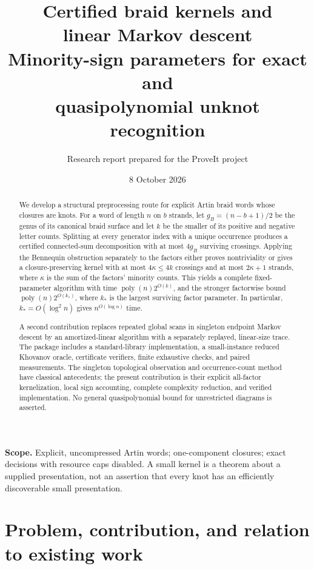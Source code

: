 \documentclass[11pt,letterpaper]{article}
\title{\vspace{-1.3em}\textbf{Certified braid kernels and\\linear Markov descent}\\[0.45em]
\large Minority-sign parameters for exact and\\quasipolynomial unknot recognition}
\author{Research report prepared for the ProveIt project}
\date{8 October 2026}
\theoremstyle{definition}
\newcommand{\poly}{\operatorname{poly}}
\begin{document}
\maketitle
\begin{abstract}
We develop a structural preprocessing route for explicit Artin braid words whose closures are knots. For a word of length $n$ on $b$ strands, let $g_B=(n-b+1)/2$ be the genus of its canonical braid surface and let $k$ be the smaller of its positive and negative letter counts. Splitting at every generator index with a unique occurrence produces a certified connected-sum decomposition with at most $4g_B$ surviving crossings. Applying the Bennequin obstruction separately to the factors either proves nontriviality or gives a closure-preserving kernel with at most $4\kappa\le4k$ crossings and at most $2\kappa+1$ strands, where $\kappa$ is the sum of the factors' minority counts. This yields a complete fixed-parameter algorithm with time $\poly(n)2^{O(k)}$, and the stronger factorwise bound $\poly(n)2^{O(k_*)}$, where $k_*$ is the largest surviving factor parameter. In particular, $k_*=O(\log^2 n)$ gives $n^{O(\log n)}$ time.

A second contribution replaces repeated global scans in singleton endpoint Markov descent by an amortized-linear algorithm with a separately replayed, linear-size trace. The package includes a standard-library implementation, a small-instance reduced Khovanov oracle, certificate verifiers, finite exhaustive checks, and paired measurements. The singleton topological observation and occurrence-count method have classical antecedents; the present contribution is their explicit all-factor kernelization, local sign accounting, complete complexity reduction, and verified implementation. No general quasipolynomial bound for unrestricted diagrams is asserted.
\end{abstract}
\vspace{0.4em}
\noindent\textbf{Scope.} Explicit, uncompressed Artin words; one-component closures; exact decisions with resource caps disabled. A small kernel is a theorem about a supplied presentation, not an assertion that every knot has an efficiently discoverable small presentation.
\newpage
{\small\setlength{\parskip}{0pt}\linespread{1}\selectfont\tableofcontents}
\newpage

\section{Problem, contribution, and relation to existing work}
\label{sec:position}
\end{document}
